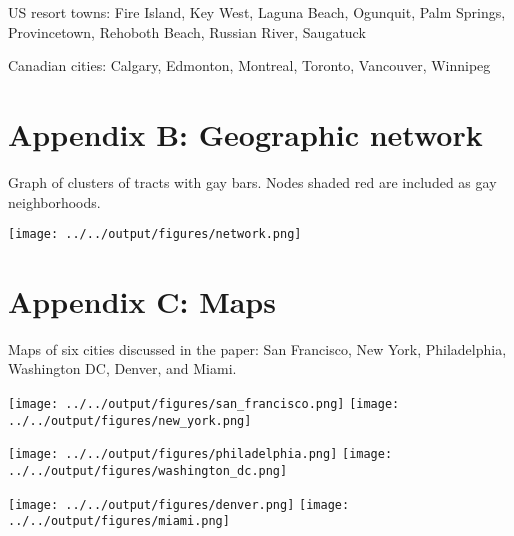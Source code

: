 US resort towns: Fire Island, Key West, Laguna Beach, Ogunquit, Palm
Springs, Provincetown, Rehoboth Beach, Russian River, Saugatuck

Canadian cities: Calgary, Edmonton, Montreal, Toronto, Vancouver,
Winnipeg

\section{Appendix B: Geographic
network}\label{appendix-b-geographic-network}

Graph of clusters of tracts with gay bars. Nodes shaded red are included
as gay neighborhoods.

\texttt{[image: ../../output/figures/network.png]}\\
\newpage

\section{Appendix C: Maps}\label{appendix-c-maps}

Maps of six cities discussed in the paper: San Francisco, New York,
Philadelphia, Washington DC, Denver, and Miami.

\texttt{[image: ../../output/figures/san\_francisco.png]}
\texttt{[image: ../../output/figures/new\_york.png]}

\texttt{[image: ../../output/figures/philadelphia.png]}
\texttt{[image: ../../output/figures/washington\_dc.png]}

\texttt{[image: ../../output/figures/denver.png]}
\texttt{[image: ../../output/figures/miami.png]}
